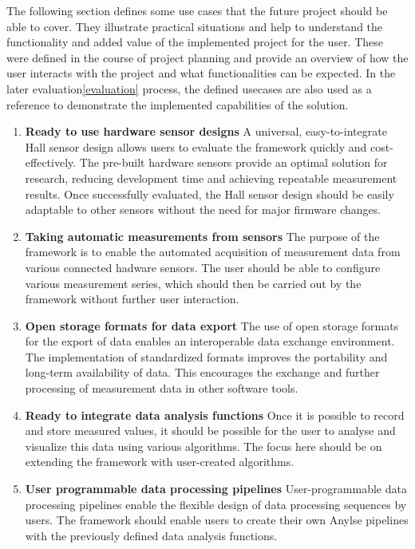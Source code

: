 The following section defines some use cases that the future project
should be able to cover. They illustrate practical situations and help
to understand the functionality and added value of the implemented
project for the user. These were defined in the course of project
planning and provide an overview of how the user interacts with the
project and what functionalities can be expected. In the later
evaluation\ref{evaluation} process, the defined usecases are also used
as a reference to demonstrate the implemented capabilities of the
solution.

\begin{enumerate}
\def\labelenumi{\arabic{enumi}.}
\item
  \textbf{Ready to use hardware sensor designs} A universal,
  easy-to-integrate Hall sensor design allows users to evaluate the
  framework quickly and cost-effectively. The pre-built hardware sensors
  provide an optimal solution for research, reducing development time
  and achieving repeatable measurement results. Once successfully
  evaluated, the Hall sensor design should be easily adaptable to other
  sensors without the need for major firmware changes.
\item
  \textbf{Taking automatic measurements from sensors} The purpose of the
  framework is to enable the automated acquisition of measurement data
  from various connected hadware sensors. The user should be able to
  configure various measurement series, which should then be carried out
  by the framework without further user interaction.
\item
  \textbf{Open storage formats for data export} The use of open storage
  formats for the export of data enables an interoperable data exchange
  environment. The implementation of standardized formats improves the
  portability and long-term availability of data. This encourages the
  exchange and further processing of measurement data in other software
  tools.
\item
  \textbf{Ready to integrate data analysis functions} Once it is
  possible to record and store measured values, it should be possible
  for the user to analyse and visualize this data using various
  algorithms. The focus here should be on extending the framework with
  user-created algorithms.
\item
  \textbf{User programmable data processing pipelines} User-programmable
  data processing pipelines enable the flexible design of data
  processing sequences by users. The framework should enable users to
  create their own Anylse pipelines with the previously defined data
  analysis functions.
\end{enumerate}

